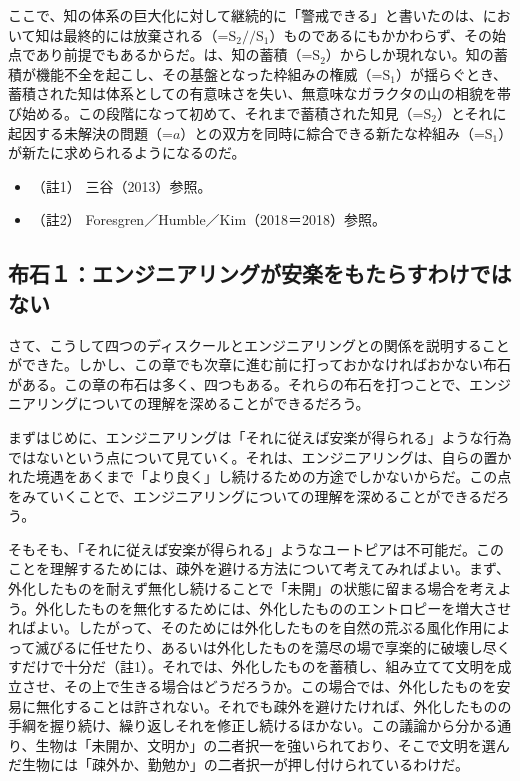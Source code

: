 ここで、知の体系の巨大化に対して継続的に「警戒できる」と書いたのは、において知は最終的には放棄される（=\(\textrm{S}_2//\textrm{S}_1\)）ものであるにもかかわらず、その始点であり前提でもあるからだ。は、知の蓄積（=\(\textrm{S}_2\)）からしか現れない。知の蓄積が機能不全を起こし、その基盤となった枠組みの権威（=\(\textrm{S}_1\)）が揺らぐとき、蓄積された知は体系としての有意味さを失い、無意味なガラクタの山の相貌を帯び始める。この段階になって初めて、それまで蓄積された知見（=\(\textrm{S}_2\)）とそれに起因する未解決の問題（=\(a\)）との双方を同時に綜合できる新たな枠組み（=\(\textrm{S}_1\)）が新たに求められるようになるのだ。

\begin{itemize}
\tightlist
\item
  （註1） 三谷（2013）\cite{Mitani}参照。
\item
  （註2） Foresgren／Humble／Kim（2018＝2018）\cite{ForesgrenEtAl}参照。
\end{itemize}

\subsection{布石１：エンジニアリングが安楽をもたらすわけではない}\label{ux5e03ux77f3uxff11ux30a8ux30f3ux30b8ux30cbux30a2ux30eaux30f3ux30b0ux304cux5b89ux697dux3092ux3082ux305fux3089ux3059ux308fux3051ux3067ux306fux306aux3044}

さて、こうして四つのディスクールとエンジニアリングとの関係を説明することができた。しかし、この章でも次章に進む前に打っておかなければおかない布石がある。この章の布石は多く、四つもある。それらの布石を打つことで、エンジニアリングについての理解を深めることができるだろう。

まずはじめに、エンジニアリングは「それに従えば安楽が得られる」ような行為ではないという点について見ていく。それは、エンジニアリングは、自らの置かれた境遇をあくまで「より良く」し続けるための方途でしかないからだ。この点をみていくことで、エンジニアリングについての理解を深めることができるだろう。

そもそも、「それに従えば安楽が得られる」ようなユートピアは不可能だ。このことを理解するためには、疎外を避ける方法について考えてみればよい。まず、外化したものを耐えず無化し続けることで「未開」の状態に留まる場合を考えよう。外化したものを無化するためには、外化したもののエントロピーを増大させればよい。したがって、そのためには外化したものを自然の荒ぶる風化作用によって滅びるに任せたり、あるいは外化したものを蕩尽の場で享楽的に破壊し尽くすだけで十分だ（註1）。それでは、外化したものを蓄積し、組み立てて文明を成立させ、その上で生きる場合はどうだろうか。この場合では、外化したものを安易に無化することは許されない。それでも疎外を避けたければ、外化したものの手綱を握り続け、繰り返しそれを修正し続けるほかない。この議論から分かる通り、生物は「未開か、文明か」の二者択一を強いられており、そこで文明を選んだ生物には「疎外か、勤勉か」の二者択一が押し付けられているわけだ。

